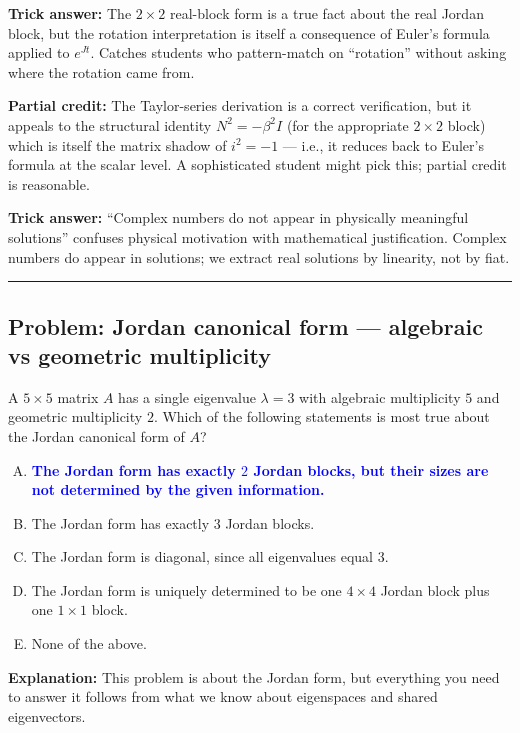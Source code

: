 \documentclass[12pt]{amsart}
\newcommand{\divider}{
  \vspace{-1em}
  \noindent
  \raisebox{-0.15ex}{\textbullet}%
  \hspace{0.5em}%
  \rule[0.5ex]{0.95\textwidth}{1.0pt}%
  \hspace{0.5em}%
  \raisebox{-0.15ex}{\textbullet}%
  \vspace{0em}
}
\begin{document}
\textbf{Trick answer:}
The $2 \times 2$ real-block form is a true fact about the real Jordan
block, but the rotation interpretation is itself a consequence of Euler's
formula applied to $e^{Jt}$. Catches students who pattern-match on
``rotation'' without asking where the rotation came from.

\textbf{Partial credit:}
The Taylor-series derivation is a correct verification, but it appeals to
the structural identity $N^2 = -\beta^2 I$ (for the appropriate $2\times 2$
block) which is itself the matrix shadow of $i^2 = -1$ --- i.e., it reduces
back to Euler's formula at the scalar level. A sophisticated student might
pick this; partial credit is reasonable.

\textbf{Trick answer:}
``Complex numbers do not appear in physically meaningful solutions''
confuses physical motivation with mathematical justification. Complex
numbers do appear in solutions; we extract real solutions by linearity,
not by fiat.

\divider

\subsection*{Problem: Jordan canonical form --- algebraic vs geometric multiplicity}

A $5 \times 5$ matrix $A$ has a single eigenvalue $\lambda = 3$ with algebraic
multiplicity $5$ and geometric multiplicity $2$. Which of the following
statements is most true about the Jordan canonical form of $A$?

\begin{enumerate}[(A)]
\item \textcolor{blue}{\textbf{The Jordan form has exactly $2$ Jordan blocks, but their sizes are not determined by the given information.}}
\item The Jordan form has exactly $3$ Jordan blocks.
\item The Jordan form is diagonal, since all eigenvalues equal $3$.
\item The Jordan form is uniquely determined to be one $4 \times 4$ Jordan block plus one $1 \times 1$ block.
\item None of the above.
\end{enumerate}

\textbf{Explanation:}
This problem is about the Jordan form, but everything you need to answer it
follows from what we know about eigenspaces and shared eigenvectors.
\end{document}
